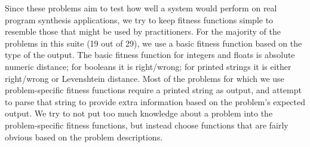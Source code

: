 \documentclass{sig-alternate}
\begin{document}
Since these problems aim to test how well a system would perform on real program synthesis applications, we try to keep fitness functions simple to resemble those that might be used by practitioners. For the majority of the problems in this suite (19 out of 29), we use a basic fitness function based on the type of the output. The basic fitness function for integers and floats is absolute numeric distance; for booleans it is right/wrong; for printed strings it is either right/wrong or Levenshtein distance. Most of the problems for which we use problem-specific fitness functions require a printed string as output, and attempt to parse that string to provide extra information based on the problem's expected output. We try to not put too much knowledge about a problem into the problem-specific fitness functions, but instead choose functions that are fairly obvious based on the problem descriptions.
\end{document}
